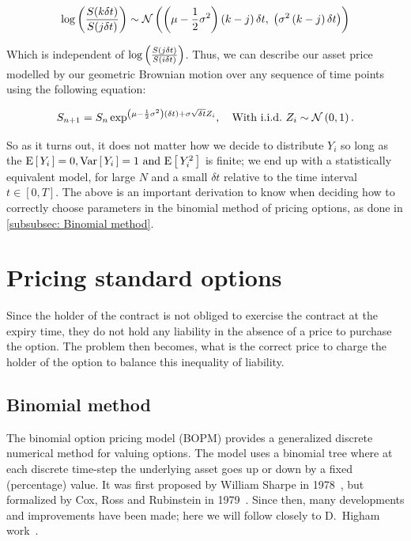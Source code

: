 \begin{equation*}
    \log\left(\frac{S(k\delta t)}{S(j\delta t)}\right) \sim \mathcal{N}\left(\left(\mu - \frac{1}{2}\sigma^2\right)\left(k-j\right)\delta t,\;\left(\sigma^2\left(k-j\right)\delta t\right)\right)
\end{equation*}

Which is independent of \(\log\left(\frac{S(j\delta t)}{S(i\delta t)}\right)\).
\nline{}
Thus, we can describe our asset price modelled by our geometric Brownian motion over any sequence of time points using the following equation:

\begin{equation}
    S_{n+1} = S_n\exp^{\left(\mu-\frac{1}{2}\sigma^2\right)\left(\delta t\right) + \sigma\sqrt{\delta t}Z_i}, \quad \text{With i.i.d.~} Z_i \sim \mathcal{N}\left(0,1\right).
\end{equation}

So as it turns out, it does not matter how we decide to distribute \(Y_i\) so long as the \(\text{E}\left[\,Y_i\,\right] = 0, \text{Var}\left[\,Y_i\,\right] = 1 \text{ and } \text{E}\left[\,Y_i^2\,\right]\) is finite; we end up with a statistically equivalent model, for large \(N\) and a small \(\delta t\) relative to the time interval \(t\in[0,T]\). 
\nline{}
The above is an important derivation to know when deciding how to correctly choose parameters in the binomial method of pricing options, as done in \autoref{subsubsec: Binomial method}.

\section{Pricing standard options}

Since the holder of the contract is not obliged to exercise the contract at the expiry time, they do not hold any liability in the absence of a price to purchase the option. The problem then becomes, what is the correct price to charge the holder of the option to balance this inequality of liability.

\subsection{Binomial method}\label{subsubsec: Binomial method}

The binomial option pricing model (BOPM) provides a generalized discrete numerical method for valuing options. The model uses a binomial tree where at each discrete time-step the underlying asset goes up or down by a fixed (percentage) value. It was first proposed by William Sharpe in 1978~\cite{sharpe1978investments}, but formalized by Cox, Ross and Rubinstein in 1979~\cite{COX1979229}. Since then, many developments and improvements have been made; here we will follow closely to D.~Higham work~\cite{higham2004introduction}.

